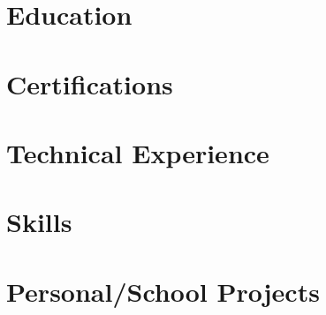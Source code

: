 \documentclass[letter,11pt]{article}
\begin{document}
	
	\section{Education}
	
	
	\section{Certifications}
	
	
	\section{Technical Experience}
	
	
	\section{Skills}
	
	
	\section{Personal/School Projects}
	
	
	
\end{document}
